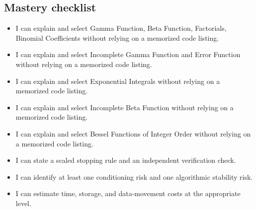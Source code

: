 \documentclass[10pt,letterpaper]{article}
\begin{document}
\subsection*{Mastery checklist}
\begin{itemize}
\item[$\square$] I can explain and select Gamma Function, Beta Function, Factorials, Binomial Coefficients without relying on a memorized code listing.
\item[$\square$] I can explain and select Incomplete Gamma Function and Error Function without relying on a memorized code listing.
\item[$\square$] I can explain and select Exponential Integrals without relying on a memorized code listing.
\item[$\square$] I can explain and select Incomplete Beta Function without relying on a memorized code listing.
\item[$\square$] I can explain and select Bessel Functions of Integer Order without relying on a memorized code listing.
\item[$\square$] I can state a scaled stopping rule and an independent verification check.
\item[$\square$] I can identify at least one conditioning risk and one algorithmic stability risk.
\item[$\square$] I can estimate time, storage, and data-movement costs at the appropriate level.
\end{itemize}
\end{document}
